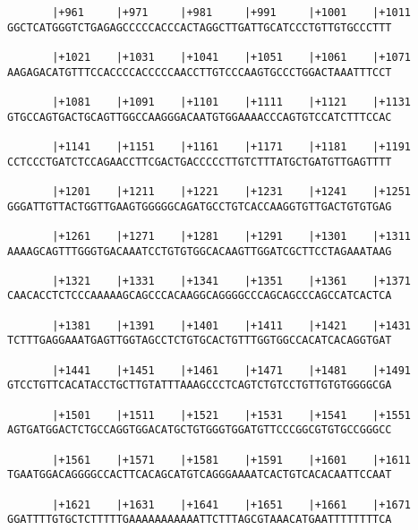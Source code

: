 \documentclass{article}
\begin{document}
\begin{Verbatim}
       |+961     |+971     |+981     |+991     |+1001    |+1011
GGCTCATGGGTCTGAGAGCCCCCACCCACTAGGCTTGATTGCATCCCTGTTGTGCCCTTT
                                                            
       |+1021    |+1031    |+1041    |+1051    |+1061    |+1071
AAGAGACATGTTTCCACCCCACCCCCAACCTTGTCCCAAGTGCCCTGGACTAAATTTCCT
                                                            
       |+1081    |+1091    |+1101    |+1111    |+1121    |+1131
GTGCCAGTGACTGCAGTTGGCCAAGGGACAATGTGGAAAACCCAGTGTCCATCTTTCCAC
                                                            
       |+1141    |+1151    |+1161    |+1171    |+1181    |+1191
CCTCCCTGATCTCCAGAACCTTCGACTGACCCCCTTGTCTTTATGCTGATGTTGAGTTTT
                                                            
       |+1201    |+1211    |+1221    |+1231    |+1241    |+1251
GGGATTGTTACTGGTTGAAGTGGGGGCAGATGCCTGTCACCAAGGTGTTGACTGTGTGAG
                                                            
       |+1261    |+1271    |+1281    |+1291    |+1301    |+1311
AAAAGCAGTTTGGGTGACAAATCCTGTGTGGCACAAGTTGGATCGCTTCCTAGAAATAAG
                                                            
       |+1321    |+1331    |+1341    |+1351    |+1361    |+1371
CAACACCTCTCCCAAAAAGCAGCCCACAAGGCAGGGGCCCAGCAGCCCAGCCATCACTCA
                                                            
       |+1381    |+1391    |+1401    |+1411    |+1421    |+1431
TCTTTGAGGAAATGAGTTGGTAGCCTCTGTGCACTGTTTGGTGGCCACATCACAGGTGAT
                                                            
       |+1441    |+1451    |+1461    |+1471    |+1481    |+1491
GTCCTGTTCACATACCTGCTTGTATTTAAAGCCCTCAGTCTGTCCTGTTGTGTGGGGCGA
                                                            
       |+1501    |+1511    |+1521    |+1531    |+1541    |+1551
AGTGATGGACTCTGCCAGGTGGACATGCTGTGGGTGGATGTTCCCGGCGTGTGCCGGGCC
                                                            
       |+1561    |+1571    |+1581    |+1591    |+1601    |+1611
TGAATGGACAGGGGCCACTTCACAGCATGTCAGGGAAAATCACTGTCACACAATTCCAAT
                                                            
       |+1621    |+1631    |+1641    |+1651    |+1661    |+1671
GGATTTTGTGCTCTTTTTGAAAAAAAAAAATTCTTTAGCGTAAACATGAATTTTTTTTCA
                                                            

\end{Verbatim}
\end{document}
